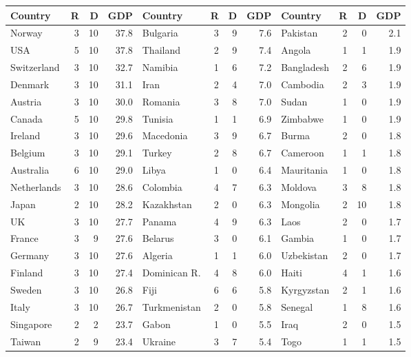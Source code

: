 \begin{table}
\begin{tabular}{|lrrr|lrrr|lrrr|}\hline
Country & R & D & GDP &
Country & R & D & GDP &
Country & R & D & GDP \\  \hline
Norway        & 3 & 10 &37.8 &Bulgaria      & 3 &  9 & 7.6&Pakistan     &2& 0&  2.1\\
USA           & 5 & 10 &37.8 &Thailand      & 2 &  9 & 7.4&Angola       &1& 1&  1.9\\
Switzerland   & 3 & 10 &32.7 &Namibia       & 1 &  6 & 7.2&Bangladesh   &2& 6&  1.9\\
Denmark       & 3 & 10 &31.1 &Iran          & 2 &  4 & 7.0&Cambodia     &2& 3&  1.9\\
Austria       & 3 & 10 &30.0 &Romania       & 3 &  8 & 7.0&Sudan        &1& 0&  1.9\\
Canada        & 5 & 10 &29.8 &Tunisia       & 1 &  1 & 6.9&Zimbabwe     &1& 0&  1.9\\
Ireland       & 3 & 10 &29.6 &Macedonia     & 3 &  9 & 6.7&Burma        &2& 0&  1.8\\
Belgium       & 3 & 10 &29.1 &Turkey        & 2 &  8 & 6.7&Cameroon     &1& 1&  1.8\\
Australia     & 6 & 10 &29.0 &Libya         & 1 &  0 & 6.4&Mauritania   &1& 0&  1.8\\
Netherlands   & 3 & 10 &28.6 &Colombia      & 4 &  7 & 6.3&Moldova      &3& 8&  1.8\\
Japan         & 2 & 10 &28.2 &Kazakhstan    & 2 &  0 & 6.3&Mongolia     &2&10&  1.8\\
UK            & 3 & 10 &27.7 &Panama        & 4 &  9 & 6.3&Laos         &2& 0&  1.7\\
France        & 3 &  9 &27.6 &Belarus       & 3 &  0 & 6.1&Gambia       &1& 0&  1.7\\
Germany       & 3 & 10 &27.6 &Algeria       & 1 &  1 & 6.0&Uzbekistan   &2& 0&  1.7\\
Finland       & 3 & 10 &27.4 &Dominican R.  & 4 &  8 & 6.0&Haiti        &4& 1&  1.6\\
Sweden        & 3 & 10 &26.8 &Fiji          & 6 &  6 & 5.8&Kyrgyzstan   &2& 1&  1.6\\
Italy         & 3 & 10 &26.7 &Turkmenistan  & 2 &  0 & 5.8&Senegal      &1& 8&  1.6\\
Singapore     & 2 &  2 &23.7 &Gabon         & 1 &  0 & 5.5&Iraq         &2& 0&  1.5\\
Taiwan        & 2 &  9 &23.4 &Ukraine       & 3 &  7 & 5.4&Togo         &1& 1&  1.5\\

\end{tabular}
\end{table}
